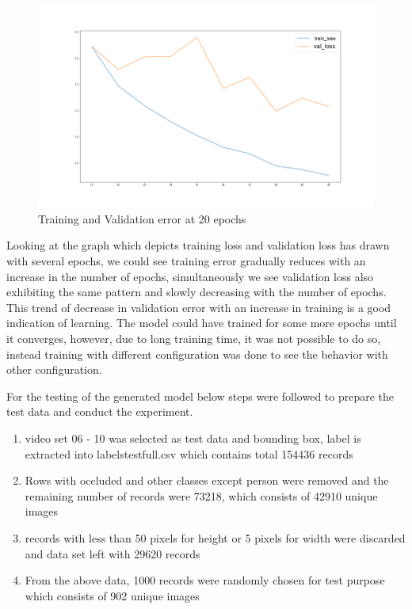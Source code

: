\begin{figure}[H]
\includegraphics[scale=0.4]{conf0_loss-val_loss_10_20epochs}
\begin{center}
\caption{Training and Validation error at 20 epochs}
\end{center}
\end{figure}

\newpara
Looking at the graph which depicts training loss and validation loss has drawn with several epochs, we could see training error gradually reduces with an increase in the number of epochs, simultaneously we see validation loss also exhibiting the same pattern and slowly decreasing with the number of epochs. This trend of decrease in validation error with an increase in training is a good indication of learning. The model could have trained for some more epochs until it converges, however, due to long training time, it was not possible to do so, instead training with different configuration was done to see the behavior with other configuration.

For the testing of the generated model below steps were followed to prepare the test data and conduct the experiment.
\begin{enumerate}
	\item video set 06 - 10 was selected as test data and bounding box, label is extracted into labels\textunderscore test\textunderscore full.csv which contains total 154436 records
	\item Rows with occluded and other classes except person were removed and the remaining number of records were 73218, which consists of 42910 unique images 
	\item records with less than 50 pixels for height or 5 pixels for width were discarded and data set left with 29620 records
	\item From the above data, 1000 records were randomly chosen for test purpose which consists of 902 unique images
\end{enumerate}

